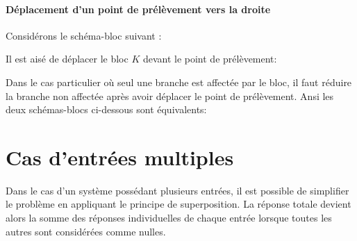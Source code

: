 \paragraph{Déplacement d'un point de prélèvement vers la droite}
Considérons le schéma-bloc suivant :
\begin{center}
    
\end{center}
Il est aisé de déplacer le bloc $K$ devant le point de prélèvement:  
\begin{center}
    
\end{center}
Dans le cas particulier où seul une branche est affectée par le bloc, 
il faut réduire la branche non affectée après avoir déplacer le point 
de prélèvement. Ansi les deux schémas-blocs ci-dessous sont équivalents:
\begin{center}
    
\end{center}
\newpage
\section{Cas d'entrées multiples\label{sec-bloc_multE}}
Dans le cas d'un système possédant plusieurs entrées, il est possible 
de simplifier le problème en appliquant le principe de superposition. La réponse 
totale devient alors la somme des réponses individuelles de chaque entrée 
lorsque toutes les autres sont considérées comme nulles.

